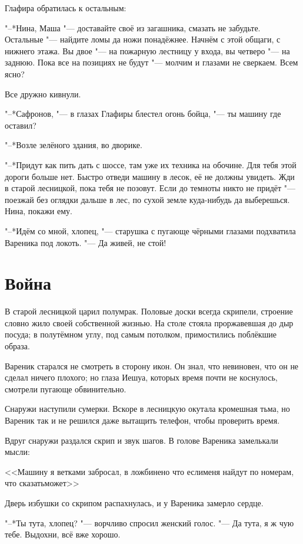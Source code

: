 Глафира обратилась к остальным:

"--*Нина, Маша "--- доставайте своё из загашника, смазать не забудьте.
Остальные "--- найдите ломы да ножи понадёжнее.
Начнём с этой общаги, с нижнего этажа.
Вы двое "--- на пожарную лестницу у входа, вы четверо "--- на заднюю.
Пока все на позициях не будут "--- молчим и глазами не сверкаем.
Всем ясно?

Все дружно кивнули.

"--*Сафронов, "--- в глазах Глафиры блестел огонь бойца, "--- ты машину где оставил?

"--*Возле зелёного здания, во дворике.

"--*Придут как пить дать с шоссе, там уже их техника на обочине.
Для тебя этой дороги больше нет.
Быстро отведи машину в лесок, её не должны увидеть.
Жди в старой лесницкой, пока тебя не позовут.
Если до темноты никто не придёт "--- поезжай без оглядки дальше в лес, по сухой земле куда-нибудь да выберешься.
Нина, покажи ему.

"--*Идём со мной, хлопец, "--- старушка с пугающе чёрными глазами подхватила Вареника под локоть.
"--- Да живей, не стой!

\section{Война}

В старой лесницкой царил полумрак.
Половые доски всегда скрипели, строение словно жило своей собственной жизнью.
На столе стояла проржавевшая до дыр посуда;
в полутёмном углу, под самым потолком, примостились поблёкшие образа.

Вареник старался не смотреть в сторону икон.
Он знал, что невиновен, что он не сделал ничего плохого;
но глаза Иешуа, которых время почти не коснулось, смотрели пугающе обвинительно. 

Снаружи наступили сумерки.
Вскоре в лесницкую окутала кромешная тьма, но Вареник так и не решился даже вытащить телефон, чтобы проверить время.

Вдруг снаружи раздался скрип и звук шагов.
В голове Вареника замелькали мысли:

<<Машину я ветками забросал, в ложбине\ldotst но что если\ldotsq меня найдут по номерам, что сказать\ldotsq может\ldotsq>>
 
Дверь избушки со скрипом распахнулась, и у Вареника замерло сердце.

"--*Ты тута, хлопец? "--- ворчливо спросил женский голос.
"--- Да тута, я ж чую тебе.
Выдохни, всё вже хорошо.

